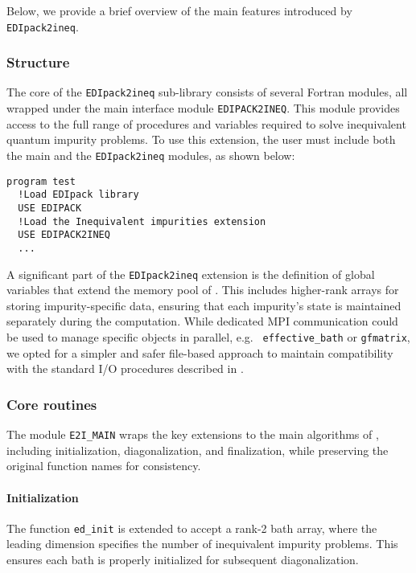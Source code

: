 \documentclass[edipack2.tex]{subfiles}
\begin{document}
Below, we provide a brief overview of the main features introduced by 
{\tt EDIpack2ineq}.

\subsubsection{Structure}\label{ssSecIneqStructure}
The core of the {\tt EDIpack2ineq} sub-library consists of several 
Fortran modules, all wrapped under the main interface module 
{\tt EDIPACK2INEQ}. This module provides access to the full range of 
procedures and variables required to solve inequivalent quantum 
impurity problems. To use this extension, the user must include both 
the main \NAME and the {\tt EDIpack2ineq} modules, as shown below:
\begin{lstlisting}[style=fstyle,numbers=none,basicstyle={\scriptsize\ttfamily}]
program test
  !Load EDIpack library 
  USE EDIPACK
  !Load the Inequivalent impurities extension
  USE EDIPACK2INEQ
  ...
\end{lstlisting}

A significant part of the {\tt EDIpack2ineq} extension is the 
definition of global variables that extend the memory pool of 
\NAME. This includes higher-rank arrays for storing impurity-specific 
data, ensuring that each impurity's state is maintained separately 
during the computation. While dedicated MPI communication could be 
used to manage specific objects in parallel, e.g. {\tt
  effective\_bath} or {\tt gfmatrix}, we opted for a simpler and safer  
file-based approach to maintain compatibility with the standard I/O 
procedures described in .


\subsubsection{Core routines}\label{ssSecIneqGlobal}
The module {\tt E2I\_MAIN} wraps the key extensions to the main 
algorithms of \NAME, including initialization, diagonalization, and 
finalization, while preserving the original function names for 
consistency. 

\paragraph{\bf Initialization} The function {\tt ed\_init} is extended to 
  accept a rank-2 bath array, where the leading dimension specifies 
  the number of inequivalent impurity problems. This ensures each bath 
  is properly initialized for subsequent diagonalization.
\end{document}
